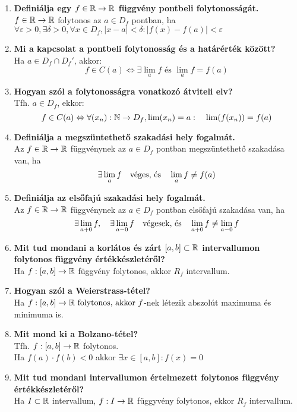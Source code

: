 \documentclass[a4paper,11pt]{article}
\begin{document}
\begin{enumerate}
	\item \textbf{Definiálja egy $f\in\displaystyle\mathbb{R}\to\mathbb{R}$ függvény pontbeli folytonosságát.}\\[0.2cm] $f\in\mathbb{R}\to\mathbb{R}$ folytonos az $a\in D_f$ pontban, ha\\[0.2cm] $\forall\varepsilon>0,\exists\delta>0,\forall x\in D_f,|x-a|<\delta : |f(x)-f(a)|<\varepsilon$
	\item \textbf{Mi a kapcsolat a pontbeli folytonosság és a határérték között?}\\[0.2cm]Ha $a\in D_f\cap D_f'$, akkor: \[ f\in C(a)\Leftrightarrow \exists\lim_a f \text{ és } \lim_a f=f(a)\]
	\item \textbf{Hogyan szól a folytonosságra vonatkozó átviteli elv?}\\[0.2cm] Tfh. $a\in D_f$, ekkor: \[f\in C(a)\Leftrightarrow\forall(x_n):\mathbb{N}\to D_f, \lim(x_n)=a:\quad\lim(f(x_n))=f(a)\]
	\item \textbf{Definiálja a megszüntethető szakadási hely fogalmát.}\\[0.1cm]
	Az $f\in\mathbb{R}\to\mathbb{R}$ függvénynek az $a\in D_f$ pontban megszüntethető szakadása van, ha \[ \exists\lim_{a} f\text{\quad véges, és\quad } \lim_a f\not=f(a)\]
	\item \textbf{Definiálja az elsőfajú szakadási hely fogalmát.}\\[0.1cm]
	Az $f\in\mathbb{R}\to\mathbb{R}$ függvénynek az $a\in D_f$ pontban elsőfajú szakadása van, ha \[ \exists \lim_{a+0} f,\quad \exists\lim_{a-0}f \text{\quad végesek, és\quad } \lim_{a+0} f \not= \lim_{a-0}f \]
	\item \textbf{Mit tud mondani a korlátos és zárt $[a,b]\subset\mathbb{R}$ intervallumon folytonos függvény értékkészletéről?}\\[0.1cm]Ha $f:[a,b]\to\mathbb{R}$ függvény folytonos, akkor $R_f$ intervallum.
	\item \textbf{Hogyan szól a Weierstrass-tétel?}\\[0.1cm]
	Ha $ f:[a,b]\to\mathbb{R}\text{ folytonos, akkor } f$-nek létezik abszolút maximuma és minimuma is.
	\item \textbf{Mit mond ki a Bolzano-tétel?}\\[0.1cm]
	Tfh. $f: [a,b] \to \mathbb{R}$ folytonos.\\[0.1cm]Ha $f(a)\cdot f(b) < 0$ akkor $\exists x \in [a,b]: f(x) = 0$
	\item \textbf{Mit tud mondani intervallumon értelmezett folytonos függvény értékkészletéről?}\\[0.1cm]Ha $I\subset\mathbb{R}$ intervallum, $f: I \to\mathbb{R}$ függyvény folytonos, ekkor $R_f$ intervallum.

\end{enumerate}
\end{document}
